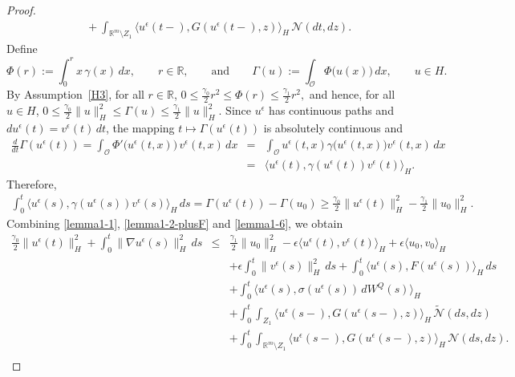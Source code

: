 \documentclass[11pt]{article}
\theoremstyle{plain}
\numberwithin{equation}{section}
\begin{document}
\begin{proof}
\begin{align}
&\quad+\int_{\mathbb R^m\setminus Z_1}\big\langle u^{\epsilon}(t-),G(u^{\epsilon}(t-),z)\big\rangle_H\, {\mathcal N}(dt,dz).
\end{align}
Define
\[
\Phi(r):=\int_0^r x\,\gamma(x)\,dx,\qquad r\in\mathbb R,
\qquad\text{and}\qquad
\Gamma(u):=\int_{\mathcal O}\Phi\big(u(x)\big)\,dx,\qquad u\in H.
\]
By Assumption~\ref{H3}, for all $r\in\mathbb R$,
\(
0\le \frac{\gamma_0}{2}r^2\le \Phi(r)\le \frac{\gamma_1}{2}r^2,
\)
and hence, for all $u\in H$,
\(
0\le \frac{\gamma_0}{2}\|u\|_H^2 \le \Gamma(u)\le \frac{\gamma_1}{2}\|u\|_H^2 .
\)
Since $u^{\epsilon}$ has continuous paths and
$du^{\epsilon}(t)=v^{\epsilon}(t)\,dt$, the mapping
$t\mapsto \Gamma(u^{\epsilon}(t))$ is absolutely continuous and
\begin{eqnarray}
\frac{d}{dt}\Gamma(u^{\epsilon}(t))
=\int_{\mathcal O}\Phi'\big(u^{\epsilon}(t,x)\big)\,v^{\epsilon}(t,x)\,dx
&=&\int_{\mathcal O}u^{\epsilon}(t,x)\gamma\big(u^{\epsilon}(t,x)\big)v^{\epsilon}(t,x)\,dx \nonumber\\
&=&\langle u^{\epsilon}(t),\gamma(u^{\epsilon}(t))v^{\epsilon}(t)\rangle_H .
\end{eqnarray}
Therefore,
\begin{eqnarray}\label{lemma1-6}
\int_0^t \langle u^{\epsilon}(s),\gamma(u^{\epsilon}(s))v^{\epsilon}(s)\rangle_H\,ds
= \Gamma(u^{\epsilon}(t))-\Gamma(u_0)
\ge \frac{\gamma_0}{2}\|u^{\epsilon}(t)\|_H^2-\frac{\gamma_1}{2}\|u_0\|_H^2 .
\end{eqnarray}
Combining \eqref{lemma1-1}, \eqref{lemma1-2-plusF} and \eqref{lemma1-6}, we obtain
\begin{eqnarray}\label{lemma1-energy-ineq}
 \frac{\gamma_0}{2}\|u^{\epsilon}(t)\|_H^2
+\int_0^t \|\nabla u^{\epsilon}(s)\|_H^2\,ds 
&\le&
\frac{\gamma_1}{2}\|u_0\|_H^2
-\epsilon\langle u^{\epsilon}(t),v^{\epsilon}(t)\rangle_H
+\epsilon\langle u_0,v_0\rangle_H \nonumber\\
&&
+\epsilon\int_0^t \|v^{\epsilon}(s)\|_H^2\,ds
+\int_0^t \langle u^{\epsilon}(s),F(u^{\epsilon}(s))\rangle_H\,ds \nonumber\\
&&
+\int_0^t \langle u^{\epsilon}(s),\sigma(u^{\epsilon}(s))\,dW^Q(s)\rangle_H \nonumber\\
&&
+\int_0^t\int_{Z_1}\langle u^{\epsilon}(s-),G(u^{\epsilon}(s-),z)\rangle_H\,\tilde{\mathcal N}(ds,dz) \nonumber\\
&&
+\int_0^t\int_{\mathbb R^m\setminus Z_1}\langle u^{\epsilon}(s-),G(u^{\epsilon}(s-),z)\rangle_H\, {\mathcal N}(ds,dz).\nonumber\\
\end{eqnarray}

\end{proof}
\end{document}
